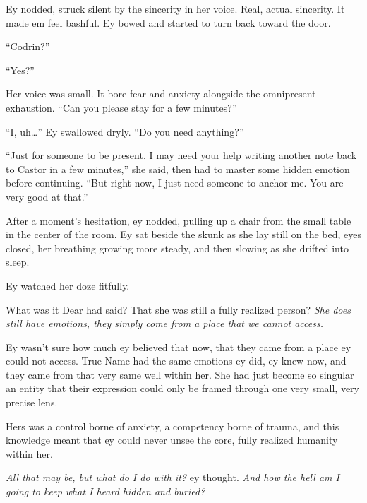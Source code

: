 Ey nodded, struck silent by the sincerity in her voice. Real, actual sincerity. It made em feel bashful. Ey bowed and started to turn back toward the door.

``Codrin?''

``Yes?''

Her voice was small. It bore fear and anxiety alongside the omnipresent exhaustion. ``Can you please stay for a few minutes?''

``I, uh\ldots{}'' Ey swallowed dryly. ``Do you need anything?''

``Just for someone to be present. I may need your help writing another note back to Castor in a few minutes,'' she said, then had to master some hidden emotion before continuing. ``But right now, I just need someone to anchor me. You are very good at that.''

After a moment's hesitation, ey nodded, pulling up a chair from the small table in the center of the room. Ey sat beside the skunk as she lay still on the bed, eyes closed, her breathing growing more steady, and then slowing as she drifted into sleep.

Ey watched her doze fitfully.

What was it Dear had said? That she was still a fully realized person? \emph{She does still have emotions, they simply come from a place that we cannot access.}

Ey wasn't sure how much ey believed that now, that they came from a place ey could not access. True Name had the same emotions ey did, ey knew now, and they came from that very same well within her. She had just become so singular an entity that their expression could only be framed through one very small, very precise lens.

Hers was a control borne of anxiety, a competency borne of trauma, and this knowledge meant that ey could never unsee the core, fully realized humanity within her.

\emph{All that may be, but what do I do with it?} ey thought. \emph{And how the hell am I going to keep what I heard hidden and buried?}

